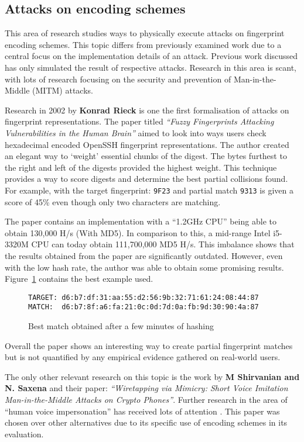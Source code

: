 \subsection{Attacks on encoding schemes}
This area of research studies ways to physically execute attacks on fingerprint encoding schemes. This topic differs from previously examined work due to a central focus on the implementation details of an attack. Previous work discussed has only simulated the result of respective attacks. Research in this area is scant, with lots of research focusing on the security and prevention of Man-in-the-Middle (MITM) attacks.

Research in 2002 by \textbf{Konrad Rieck}\cite{rieck2002fuzzy} is one the first formalisation of attacks on fingerprint representations. The paper titled \textit{``Fuzzy Fingerprints Attacking Vulnerabilities in the Human Brain''} aimed to look into ways users check hexadecimal encoded OpenSSH fingerprint representations. The author created an elegant way to `weight' essential chunks of the digest. The bytes furthest to the right and left of the digests provided the highest weight. This technique provides a way to score digests and determine the best partial collisions found. For example, with the target fingerprint: \verb|9F23| and partial match \verb|9313| is given a score of 45\% even though only two characters are matching.

The paper contains an implementation with a ``1.2GHz CPU'' being able to obtain 130,000 H/s (With MD5). In comparison to this, a mid-range Intel i5-3320M CPU can today obtain 111,700,000 MD5 H/s. This imbalance shows that the results obtained from the paper are significantly outdated. However, even with the low hash rate, the author was able to obtain some promising results. Figure~\ref{ref:fuzz} contains the best example used.

\begin{figure}[!h]
    \centering
    \verb|TARGET: d6:b7:df:31:aa:55:d2:56:9b:32:71:61:24:08:44:87|
    \verb|MATCH:  d6:b7:8f:a6:fa:21:0c:0d:7d:0a:fb:9d:30:90:4a:87|
    \caption{Best match obtained after a few minutes of hashing}
    \label{ref:fuzz}
\end{figure}

Overall the paper shows an interesting way to create partial fingerprint matches but is not quantified by any empirical evidence gathered on real-world users. 

The only other relevant research on this topic is the work by \textbf{M Shirvanian and N. Saxena}\cite{shirvanian2014wiretapping} 
and their paper: \textit{``Wiretapping via Mimicry: Short 
Voice Imitation Man-in-the-Middle Attacks on Crypto 
Phones''}. Further research in the area of ``human voice impersonation'' has received lots of attention \cite{mukhopadhyay2015all}\cite{chen2017you}\cite{wu2015spoofing}. This paper was chosen over other alternatives due to its specific use of encoding schemes in its evaluation.

